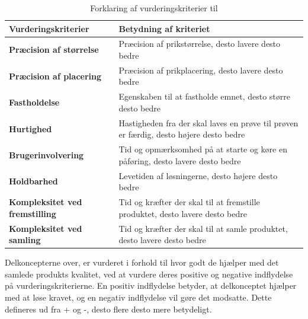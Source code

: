 \begin{table}[H]
    \centering
    \caption{Forklaring af vurderingskriterier til }
    \begin{tabular}{|l|p{9cm}|} \hline
        \rowcolor{gray!20} Vurderingskriterier & Betydning af kriteriet \\ \hline
         \multicolumn{1}{|l|}{\cellcolor{lillaB} \color{white} \textbf{Præcision af størrelse}}  & Præcision af prikstørrelse, desto lavere desto bedre\\  \hline
         \multicolumn{1}{|l|}{\cellcolor{pinkB} \color{white} \textbf{Præcision af placering}}  & Præcision af prikplacering, desto lavere desto bedre \\  \hline
         \multicolumn{1}{|l|}{\cellcolor{gulB} \textbf{Fastholdelse}}  & Egenskaben til at fastholde emnet, desto større desto bedre \\  \hline
         \multicolumn{1}{|l|}{\cellcolor{blueB} \color{white} \textbf{Hurtighed}}  & Hastigheden fra der skal laves en prøve til prøven er færdig, desto højere desto bedre \\\hline
         \multicolumn{1}{|l|}{\cellcolor{redB} \color{white} \textbf{Brugerinvolvering}}  &  Tid og opmærksomhed på at starte og køre en påføring, desto lavere desto bedre \\\hline
         \multicolumn{1}{|l|}{\cellcolor{orangeB} \color{white} \textbf{Holdbarhed}}  &  Levetiden af løsningerne, desto højere desto bedre \\\hline
         \multicolumn{1}{|l|}{\cellcolor{greenB} \color{white} \textbf{Kompleksitet ved fremstilling}}  & Tid og kræfter der skal til at fremstille produktet, desto lavere desto bedre \\\hline
         \multicolumn{1}{|l|}{\cellcolor{greenlysB} \color{white} \textbf{Kompleksitet ved samling}}  &  Tid og kræfter der skal til at samle produktet, desto lavere desto bedre \\\hline
    \end{tabular}
\end{table}

Delkoncepterne over, er vurderet i forhold til hvor godt de hjælper med det samlede produkts kvalitet, ved at vurdere deres positive og negative indflydelse på vurderingskriterierne. En positiv indflydelse betyder, at delkonceptet hjælper med at løse kravet, og en negativ indflydelse vil gøre det modsatte. Dette defineres ud fra + og -, desto flere desto mere betydeligt.

